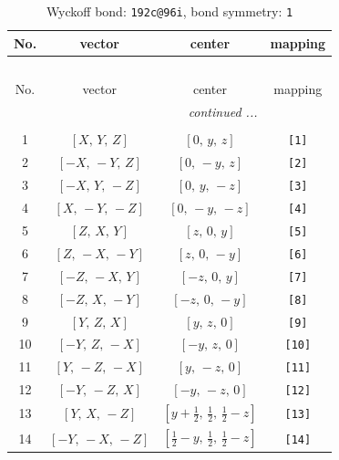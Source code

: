 \documentclass[fleqn,8pt]{jsarticle}
\begin{document}
\begin{longtable}{cccc}
\caption{Wyckoff bond: {\tt 192c@96i}, bond symmetry: {\tt 1}}
 \\
 \hline \hline
No. & vector & center & mapping \\ \hline \endfirsthead

\multicolumn{3}{l}{\tablename\ \thetable{}} \\
 \hline \hline
No. & vector & center & mapping \\ \hline \endhead

 \hline \hline
\multicolumn{3}{r}{\footnotesize\it continued ...} \\ \endfoot

 \hline \hline
\multicolumn{3}{r}{} \\ \endlastfoot

1 & $\left[ X,\, Y,\, Z \right]$ & $\left[ 0,\, y,\, z \right]$ & {\tt [1]} \\ \hline
2 & $\left[ - X,\, - Y,\, Z \right]$ & $\left[ 0,\, - y,\, z \right]$ & {\tt [2]} \\ \hline
3 & $\left[ - X,\, Y,\, - Z \right]$ & $\left[ 0,\, y,\, - z \right]$ & {\tt [3]} \\ \hline
4 & $\left[ X,\, - Y,\, - Z \right]$ & $\left[ 0,\, - y,\, - z \right]$ & {\tt [4]} \\ \hline
5 & $\left[ Z,\, X,\, Y \right]$ & $\left[ z,\, 0,\, y \right]$ & {\tt [5]} \\ \hline
6 & $\left[ Z,\, - X,\, - Y \right]$ & $\left[ z,\, 0,\, - y \right]$ & {\tt [6]} \\ \hline
7 & $\left[ - Z,\, - X,\, Y \right]$ & $\left[ - z,\, 0,\, y \right]$ & {\tt [7]} \\ \hline
8 & $\left[ - Z,\, X,\, - Y \right]$ & $\left[ - z,\, 0,\, - y \right]$ & {\tt [8]} \\ \hline
9 & $\left[ Y,\, Z,\, X \right]$ & $\left[ y,\, z,\, 0 \right]$ & {\tt [9]} \\ \hline
10 & $\left[ - Y,\, Z,\, - X \right]$ & $\left[ - y,\, z,\, 0 \right]$ & {\tt [10]} \\ \hline
11 & $\left[ Y,\, - Z,\, - X \right]$ & $\left[ y,\, - z,\, 0 \right]$ & {\tt [11]} \\ \hline
12 & $\left[ - Y,\, - Z,\, X \right]$ & $\left[ - y,\, - z,\, 0 \right]$ & {\tt [12]} \\ \hline
13 & $\left[ Y,\, X,\, - Z \right]$ & $\left[ y + \frac{1}{2},\, \frac{1}{2},\, \frac{1}{2} - z \right]$ & {\tt [13]} \\ \hline
14 & $\left[ - Y,\, - X,\, - Z \right]$ & $\left[ \frac{1}{2} - y,\, \frac{1}{2},\, \frac{1}{2} - z \right]$ & {\tt [14]} \\ \hline

\end{longtable}
\end{document}
